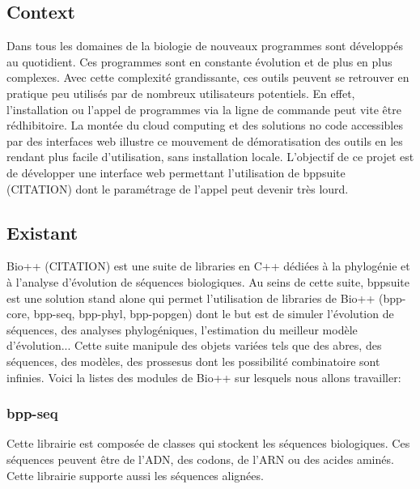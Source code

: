 

\subsection{Context}
	
	
	Dans tous les domaines de la biologie de nouveaux programmes sont développés au quotidient. Ces programmes sont en constante évolution et de plus en plus complexes. Avec cette complexité grandissante, ces outils peuvent se retrouver en pratique peu utilisés par de nombreux utilisateurs potentiels. En effet, l'installation ou l'appel de programmes via la ligne de commande peut vite être rédhibitoire.
	La montée du cloud computing et des solutions no code accessibles par des interfaces web illustre ce mouvement de démoratisation des outils en les rendant plus facile d'utilisation, sans installation locale.
	L'objectif de ce projet est de développer une interface web permettant l'utilisation de bppsuite (CITATION) dont le paramétrage de l'appel peut devenir très lourd.
	
	
\subsection{Existant}
	Bio++ (CITATION) est une suite de libraries en C++ dédiées à la phylogénie et à l'analyse d'évolution de séquences biologiques. Au seins de cette suite, bppsuite est une solution stand alone qui permet l'utilisation de libraries de Bio++ (bpp-core, bpp-seq, bpp-phyl, bpp-popgen) dont le but est de simuler l'évolution de séquences, des analyses phylogéniques, l'estimation du meilleur modèle d'évolution... Cette suite manipule des objets variées tels que des abres, des séquences, des modèles, des prossesus dont les possibilité combinatoire sont infinies. Voici la listes des modules de Bio++ sur lesquels nous allons travailler:
	
	\subsubsection*{bpp-seq}
	Cette librairie est composée de classes qui stockent les séquences biologiques. Ces séquences peuvent être de l'ADN, des codons, de l'ARN ou des acides aminés. Cette librairie supporte aussi les séquences alignées.
	
